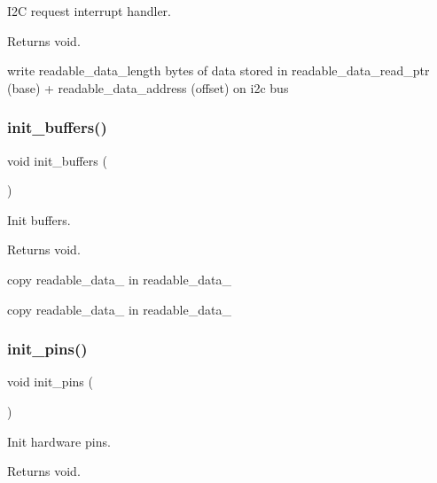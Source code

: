 I2C request interrupt handler. 

\begin{DoxyReturn}{Returns}
void. 
\end{DoxyReturn}
write readable\+\_\+data\+\_\+length bytes of data stored in readable\+\_\+data\+\_\+read\+\_\+ptr (base) + readable\+\_\+data\+\_\+address (offset) on i2c bus \mbox{\label{i2c-th_8h_ad438327c9cf783bd9c519ce8b8ef3bfa}} 
\subsubsection{\texorpdfstring{init\+\_\+buffers()}{init\_buffers()}}
{\footnotesize\ttfamily void init\+\_\+buffers (\begin{DoxyParamCaption}{ }\end{DoxyParamCaption})}



Init buffers. 

\begin{DoxyReturn}{Returns}
void. 
\end{DoxyReturn}
copy readable\+\_\+data\+\_ in readable\+\_\+data\+\_

copy readable\+\_\+data\+\_ in readable\+\_\+data\+\_ \mbox{\label{i2c-th_8h_aa9c113540346b54d49b2a596e6ba8480}} 
\subsubsection{\texorpdfstring{init\+\_\+pins()}{init\_pins()}}
{\footnotesize\ttfamily void init\+\_\+pins (\begin{DoxyParamCaption}{ }\end{DoxyParamCaption})}



Init hardware pins. 

\begin{DoxyReturn}{Returns}
void. 
\end{DoxyReturn}
\mbox{\label{i2c-th_8h_afb98a0f07c30784284f48271ffe02b97}} 
